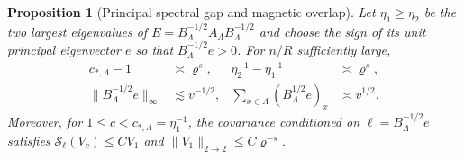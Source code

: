 \documentclass[11pt]{article}
\newtheorem{proposition}[theorem]{Proposition}
\theoremstyle{definition}
\begin{document}
\begin{proposition}[Principal spectral gap and magnetic overlap]
\label{prop:cube-principal-mode}
Let \(\eta_1\ge\eta_2\) be the two largest eigenvalues of
\(E=B_\Lambda^{-1/2}A_\Lambda B_\Lambda^{-1/2}\) and choose
the sign of its unit principal eigenvector \(e\) so that
\(B_\Lambda^{-1/2}e>0\). For \(n/R\) sufficiently large,
\begin{equation}
 \begin{aligned}
 c_{*,\Lambda}-1&\asymp\varrho^s, &
 \eta_2^{-1}-\eta_1^{-1}&\asymp\varrho^s,\\
 \|B_\Lambda^{-1/2}e\|_\infty&\lesssim v^{-1/2}, &
 \sum_{x\in\Lambda}(B_\Lambda^{1/2}e)_x&\asymp v^{1/2}.
 \end{aligned}
\end{equation}
Moreover, for \(1\le c<c_{*,\Lambda}=\eta_1^{-1}\),
the covariance conditioned on \(\ell=B_\Lambda^{-1/2}e\) satisfies
\(\mathcal S_\ell(V_c)\le C V_1\) and
\(\|V_1\|_{2\to2}\le C\varrho^{-s}\).
\end{proposition}
\end{document}
